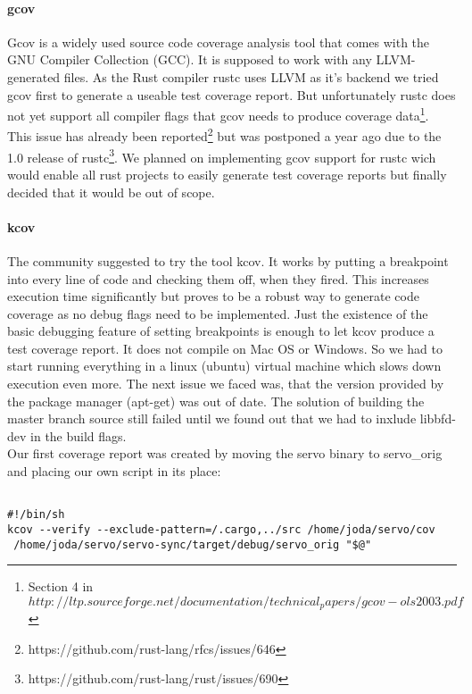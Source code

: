 \documentclass{scrartcl}
\begin{document}
\paragraph{gcov}
Gcov is a widely used source code coverage analysis tool that comes with the GNU Compiler Collection (GCC). It is supposed to work with any LLVM-generated files. As the Rust compiler rustc uses LLVM as it's backend we tried gcov first to generate a useable test coverage report. But unfortunately rustc does not yet support all compiler flags that gcov needs to produce coverage data\footnote{Section 4 in $http://ltp.sourceforge.net/documentation/technical_papers/gcov-ols2003.pdf$}. This issue has already been reported\footnote{https://github.com/rust-lang/rfcs/issues/646} but was postponed a year ago due to the 1.0 release of rustc\footnote{https://github.com/rust-lang/rust/issues/690}. We planned on implementing gcov support for rustc wich would enable all rust projects to easily generate test coverage reports but finally decided that it would be out of scope.

\paragraph{kcov}
The community suggested to try the tool kcov. It works by putting a breakpoint into every line of code and checking them off, when they fired. This increases execution time significantly but proves to be a robust way to generate code coverage as no debug flags need to be implemented. Just the existence of the basic debugging feature of setting breakpoints is enough to let kcov produce a test coverage report. It does not compile on Mac OS or Windows. So we had to start running everything in a linux (ubuntu) virtual machine which slows down execution even more. The next issue we faced was, that the version provided by the package manager (apt-get) was out of date. The solution of building the master branch source still failed until we found out that we had to inxlude libbfd-dev in the build flags.\\

Our first coverage report was created by moving the servo binary to servo\_orig and placing our own script in its place:

\begin{verbatim}

#!/bin/sh
kcov --verify --exclude-pattern=/.cargo,../src /home/joda/servo/cov 
 /home/joda/servo/servo-sync/target/debug/servo_orig "$@"

\end{verbatim}
\end{document}
